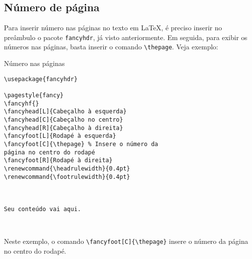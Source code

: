 \subsection{Número de página}
Para inserir número nas páginas no texto em \LaTeX{}, é preciso inserir no preâmbulo o pacote \verb|fancyhdr|, já visto anteriormente. Em seguida, para exibir os números nas páginas, basta inserir o comando \verb|\thepage|. Veja exemplo:
\begin{trailer}{Número nas páginas}
\begin{verbatim}
\usepackage{fancyhdr}

\pagestyle{fancy}
\fancyhf{}
\fancyhead[L]{Cabeçalho à esquerda}
\fancyhead[C]{Cabeçalho no centro}
\fancyhead[R]{Cabeçalho à direita}
\fancyfoot[L]{Rodapé à esquerda}
\fancyfoot[C]{\thepage} % Insere o número da 
página no centro do rodapé
\fancyfoot[R]{Rodapé à direita}
\renewcommand{\headrulewidth}{0.4pt}
\renewcommand{\footrulewidth}{0.4pt}



Seu conteúdo vai aqui.



\end{verbatim}
\end{trailer}

\noindent Neste exemplo, o comando \verb|\fancyfoot[C]{\thepage}| insere o número da página no centro do rodapé.



